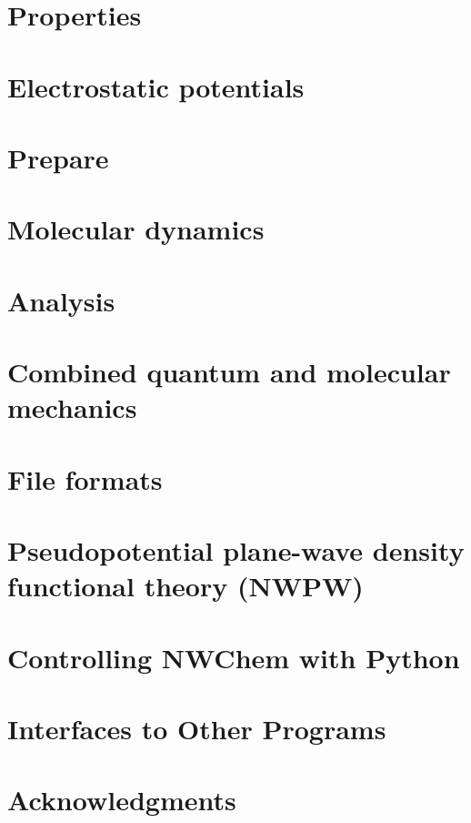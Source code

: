 \chapter{Properties}


\chapter{Electrostatic potentials}


\chapter{Prepare}


\chapter{Molecular dynamics}


\chapter{Analysis}


\chapter{Combined quantum and molecular mechanics}


\chapter{File formats}


\chapter{Pseudopotential plane-wave density functional theory (NWPW)}


\chapter{Controlling NWChem with Python}


\chapter{Interfaces to Other Programs}


\clearpage
\chapter{Acknowledgments}

\clearpage

